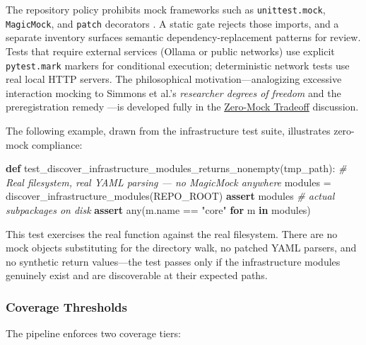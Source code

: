 \documentclass[
  english,
]{article}
\newenvironment{Shaded}{}{}
\newcommand{\BuiltInTok}[1]{\textcolor[rgb]{0.00,0.50,0.00}{#1}}
\newcommand{\CommentTok}[1]{\textcolor[rgb]{0.38,0.63,0.69}{\textit{#1}}}
\newcommand{\ControlFlowTok}[1]{\textcolor[rgb]{0.00,0.44,0.13}{\textbf{#1}}}
\newcommand{\KeywordTok}[1]{\textcolor[rgb]{0.00,0.44,0.13}{\textbf{#1}}}
\newcommand{\NormalTok}[1]{#1}
\newcommand{\OperatorTok}[1]{\textcolor[rgb]{0.40,0.40,0.40}{#1}}
\newcommand{\StringTok}[1]{\textcolor[rgb]{0.25,0.44,0.63}{#1}}
\newcounter{none} %
\begin{document}
The repository policy prohibits mock frameworks such as
\texttt{unittest.mock}, \texttt{MagicMock}, and \texttt{patch}
decorators \citep{martin2008clean, meszaros2007xunit}. A static gate
rejects those imports, and a separate inventory surfaces semantic
dependency-replacement patterns for review. Tests that require external
services (Ollama or public networks) use explicit \texttt{pytest.mark}
markers for conditional execution; deterministic network tests use real
local HTTP servers. The philosophical motivation---analogizing excessive
interaction mocking to Simmons et al.'s \emph{researcher degrees of
freedom} \citep{simmons2011falsepositive} and the preregistration remedy
\citep{nosek2018preregistration}---is developed fully in the
\href{05a_zeromock_tradeoff.md\#the-zero-mock-tradeoff}{Zero-Mock
Tradeoff} discussion.

The following example, drawn from the infrastructure test suite,
illustrates zero-mock compliance:

\begin{Shaded}
\begin{Highlighting}[]
\KeywordTok{def}\NormalTok{ test\_discover\_infrastructure\_modules\_returns\_nonempty(tmp\_path):}
    \CommentTok{\# Real filesystem, real YAML parsing — no MagicMock anywhere}
\NormalTok{    modules }\OperatorTok{=}\NormalTok{ discover\_infrastructure\_modules(REPO\_ROOT)}
    \ControlFlowTok{assert}\NormalTok{ modules                     }\CommentTok{\# actual subpackages on disk}
    \ControlFlowTok{assert} \BuiltInTok{any}\NormalTok{(m.name }\OperatorTok{==} \StringTok{"core"} \ControlFlowTok{for}\NormalTok{ m }\KeywordTok{in}\NormalTok{ modules)}
\end{Highlighting}
\end{Shaded}

This test exercises the real 
function against the real filesystem. There are no mock objects
substituting for the directory walk, no patched YAML parsers, and no
synthetic return values---the test passes only if the infrastructure
modules genuinely exist and are discoverable at their expected paths.

\subsubsection{Coverage Thresholds}\label{coverage-thresholds}

The pipeline enforces two coverage tiers:
\end{document}
